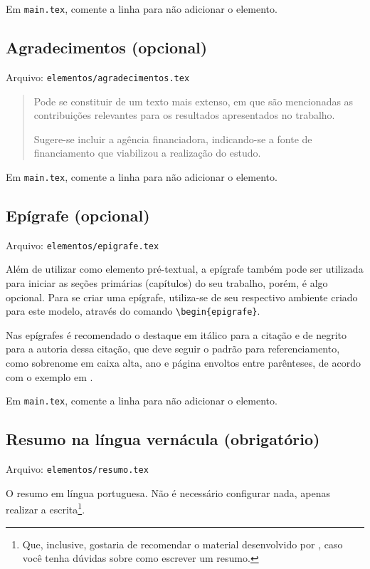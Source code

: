     Em \texttt{main.tex}, comente a linha \verb|| para não adicionar o elemento.

\subsection{Agradecimentos (opcional)}
    Arquivo: \texttt{elementos/agradecimentos.tex}

    \blockcquote[p.32]{livro:iffar-guia-normalizacao-2022}{Pode se constituir de um texto mais extenso, em que são mencionadas as contribuições relevantes para os resultados apresentados no trabalho.

    Sugere-se incluir a agência financiadora, indicando-se a fonte de
    financiamento que viabilizou a realização do estudo.}

    Em \texttt{main.tex}, comente a linha \verb|| para não adicionar o elemento.

\subsection{Epígrafe (opcional)}
    Arquivo: \texttt{elementos/epigrafe.tex}

    Além de utilizar como elemento pré-textual, a epígrafe também pode ser utilizada para iniciar as seções primárias (capítulos) do seu trabalho, porém, é algo opcional. Para se criar uma epígrafe, utiliza-se de seu respectivo ambiente criado para este modelo, através do comando \verb|\begin{epigrafe}|.

    Nas epígrafes é recomendado o destaque em itálico para a citação e de negrito para a autoria dessa citação, que deve seguir o padrão para referenciamento, como sobrenome em caixa alta, ano e página envoltos entre parênteses, de acordo com o exemplo em \textcite[figura 14, p. 39]{livro:iffar-guia-normalizacao-2022}.

    Em \texttt{main.tex}, comente a linha \verb|| para não adicionar o elemento.

\subsection{Resumo na língua vernácula (obrigatório)}\myIdxResumoVernac
    Arquivo: \texttt{elementos/resumo.tex}

    O resumo em língua portuguesa. Não é necessário configurar nada, apenas realizar a escrita\footnote{Que, inclusive, gostaria de recomendar o material desenvolvido por \textcite{pdf:resumo-aluisio}, caso você tenha dúvidas sobre como escrever um resumo.}.


